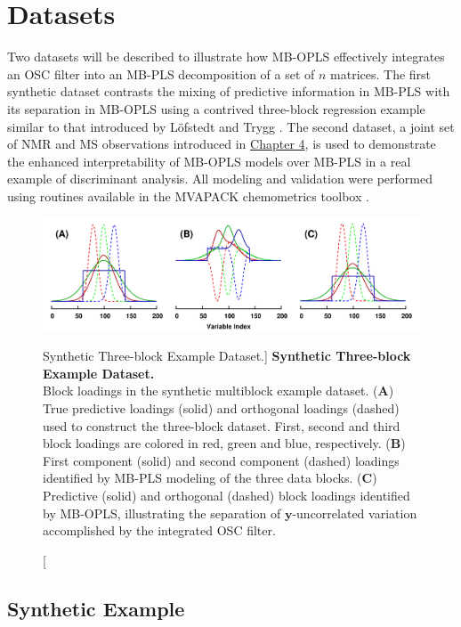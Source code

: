 \section{Datasets}

\begin{doublespace}
Two datasets will be described to illustrate how MB-OPLS effectively
integrates an OSC filter into an MB-PLS decomposition of a set of $n$
matrices. The first synthetic dataset contrasts the mixing of predictive
information in MB-PLS with its separation in MB-OPLS using a contrived
three-block regression example similar to that introduced by L\"{o}fstedt
and Trygg \cite{lofstedt:jchemo2011}. The second dataset, a joint set of
NMR and MS observations introduced in \hyperlink{section.4.3}{Chapter 4},
is used to demonstrate the enhanced interpretability of MB-OPLS models
over MB-PLS in a real example of discriminant analysis. All modeling and
validation were performed using routines available in the MVAPACK
chemometrics toolbox \cite{worley:acscb2014}.
\end{doublespace}

\begin{figure}[ht!]
\includegraphics[width=6in]{figs/mbopls/01-synthetic.png}
\caption
      [Synthetic Three-block Example Dataset.]{
  {\bf Synthetic Three-block Example Dataset.}
  \\
  Block loadings in the synthetic multiblock example dataset.
  ({\bf A}) True predictive loadings (solid) and orthogonal loadings (dashed)
  used to construct the three-block dataset. First, second and third block
  loadings are colored in red, green and blue, respectively.
  ({\bf B}) First component (solid) and second component (dashed) loadings
  identified by MB-PLS modeling of the three data blocks.
  ({\bf C}) Predictive (solid) and orthogonal (dashed) block loadings
  identified by MB-OPLS, illustrating the separation of
  $\mathbf{y}$-uncorrelated variation accomplished by the integrated
  OSC filter.
}
\label{figure.9.1}
\end{figure}

\subsection{Synthetic Example}

